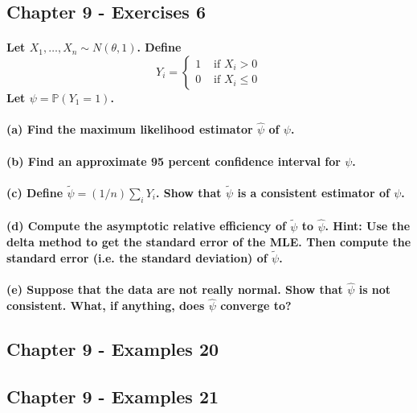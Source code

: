 \documentclass{article}
\begin{document}
\subsection{Chapter 9 - Exercises 6}
\paragraph{Let $X_{1}, \ldots, X_{n} \sim N(\theta, 1)$. Define
$$
Y_{i}=\left\{\begin{array}{ll}
1 & \text { if } X_{i}>0 \\
0 & \text { if } X_{i} \leq 0
\end{array}\right.
$$
Let $\psi=\mathbb{P}\left(Y_{1}=1\right)$.}
\paragraph{(a) Find the maximum likelihood estimator $\widehat{\psi}$ of $\psi$.}
\paragraph{(b) Find an approximate 95 percent confidence interval for $\psi$.}
\paragraph{(c) Define $\widetilde{\psi}=(1 / n) \sum_{i} Y_{i}$. Show that $\widetilde{\psi}$ is a consistent estimator of $\psi$.}
\paragraph{(d) Compute the asymptotic relative efficiency of $\widetilde{\psi}$ to $\widehat{\psi}$. Hint: Use the delta method to get the standard error of the MLE. Then compute the standard error (i.e. the standard deviation) of $\widetilde{\psi}$.}
\paragraph{(e) Suppose that the data are not really normal. Show that $\widehat{\psi}$ is not consistent. What, if anything, does $\widehat{\psi}$ converge to?}

\subsection{Chapter 9 - Examples 20}
\subsection{Chapter 9 - Examples 21}
\end{document}
